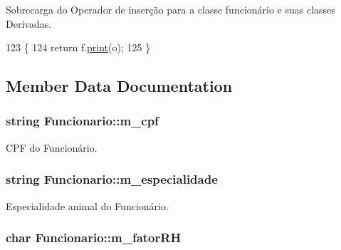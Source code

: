 Sobrecarga do Operador de inserção para a classe funcionário e suas classes Derivadas. 


\begin{DoxyCode}
123 \{
124     \textcolor{keywordflow}{return} f.\hyperlink{classFuncionario_a06bb354ea21c7059a9740a6402f26b5c}{print}(o);
125 \}
\end{DoxyCode}


\subsection{Member Data Documentation}
\subsubsection[{\texorpdfstring{m\+\_\+cpf}{m_cpf}}]{\setlength{\rightskip}{0pt plus 5cm}string Funcionario\+::m\+\_\+cpf\hspace{0.3cm}{\ttfamily [protected]}}\hypertarget{classFuncionario_af367fc8ad2efde9527d1ed0455560690}{}\label{classFuncionario_af367fc8ad2efde9527d1ed0455560690}


C\+PF do Funcionário. 

\subsubsection[{\texorpdfstring{m\+\_\+especialidade}{m_especialidade}}]{\setlength{\rightskip}{0pt plus 5cm}string Funcionario\+::m\+\_\+especialidade\hspace{0.3cm}{\ttfamily [protected]}}\hypertarget{classFuncionario_a501682f1767cc891f9908ebc42e9e186}{}\label{classFuncionario_a501682f1767cc891f9908ebc42e9e186}


Especialidade animal do Funcionário. 

\subsubsection[{\texorpdfstring{m\+\_\+fator\+RH}{m_fatorRH}}]{\setlength{\rightskip}{0pt plus 5cm}char Funcionario\+::m\+\_\+fator\+RH\hspace{0.3cm}{\ttfamily [protected]}}\hypertarget{classFuncionario_ae9e77a47e6604c3d981de2e868619b6d}{}\label{classFuncionario_ae9e77a47e6604c3d981de2e868619b6d}


